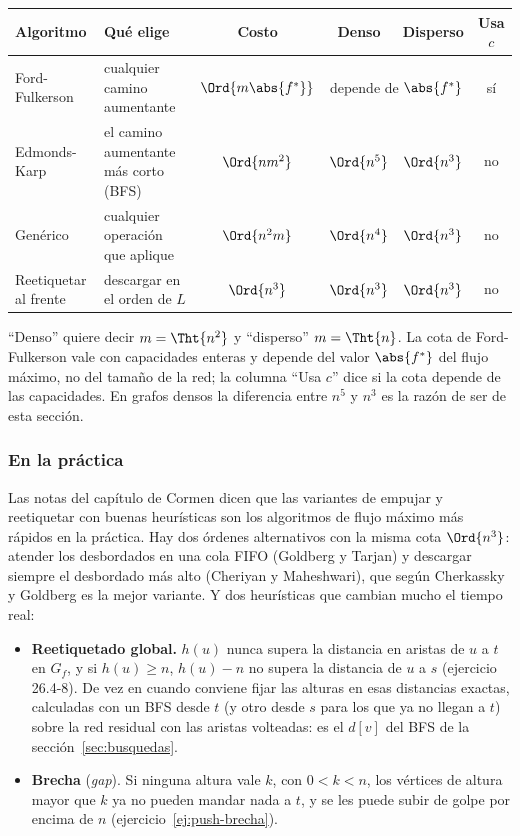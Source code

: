 \documentclass[11pt,letterpaper]{article}
\begin{document}
\begin{center}
\small
\begin{tabular}{l>{\raggedright\arraybackslash}p{3.4cm}cccc}
  \toprule
  \textbf{Algoritmo} & \textbf{Qué elige} & \textbf{Costo}
    & \textbf{Denso} & \textbf{Disperso} & \textbf{Usa $c$} \\
  \midrule
  Ford-Fulkerson & cualquier camino aumentante
    & $\Ord{m \abs{f^*}}$ & \multicolumn{2}{c}{depende de $\abs{f^*}$}
    & sí \\
  \addlinespace
  Edmonds-Karp & el camino aumentante más corto (BFS)
    & $\Ord{n m^2}$ & $\Ord{n^5}$ & $\Ord{n^3}$ & no \\
  \addlinespace
  Genérico & cualquier operación que aplique
    & $\Ord{n^2 m}$ & $\Ord{n^4}$ & $\Ord{n^3}$ & no \\
  \addlinespace
  Reetiquetar al frente & descargar en el orden de $L$
    & $\Ord{n^3}$ & $\Ord{n^3}$ & $\Ord{n^3}$ & no \\
  \bottomrule
\end{tabular}
\end{center}

``Denso'' quiere decir $m = \Tht{n^2}$ y ``disperso'' $m = \Tht{n}$.
La cota de Ford-Fulkerson vale con capacidades enteras y depende del
valor $\abs{f^*}$ del flujo máximo, no del tamaño de la red; la
columna ``Usa $c$'' dice si la cota depende de las capacidades. En
grafos densos la diferencia entre $n^5$ y $n^3$ es la razón de ser de
esta sección.

\subsubsection*{En la práctica}

Las notas del capítulo de Cormen dicen que las variantes de empujar y
reetiquetar con buenas heurísticas son los algoritmos de flujo máximo
más rápidos en la práctica. Hay dos órdenes alternativos con la misma
cota $\Ord{n^3}$: atender los desbordados en una cola FIFO (Goldberg y
Tarjan) y descargar siempre el desbordado más alto (Cheriyan y
Maheshwari), que según Cherkassky y Goldberg es la mejor variante. Y
dos heurísticas que cambian mucho el tiempo real:
\begin{itemize}
  \item \textbf{Reetiquetado global.} $h(u)$ nunca supera la distancia
        en aristas de $u$ a $t$ en $G_f$, y si $h(u) \ge n$, $h(u) - n$
        no supera la distancia de $u$ a $s$ (ejercicio 26.4-8). De vez
        en cuando conviene fijar las alturas en esas distancias exactas,
        calculadas con un BFS desde $t$ (y otro desde $s$ para los que
        ya no llegan a $t$) sobre la red residual con las aristas
        volteadas: es el $d[v]$ del BFS de la
        sección~\ref{sec:busquedas}.
  \item \textbf{Brecha} (\textit{gap}). Si ninguna altura vale $k$, con
        $0 < k < n$, los vértices de altura mayor que $k$ ya no pueden
        mandar nada a $t$, y se les puede subir de golpe por encima de
        $n$ (ejercicio~\ref{ej:push-brecha}).
\end{itemize}
\end{document}
